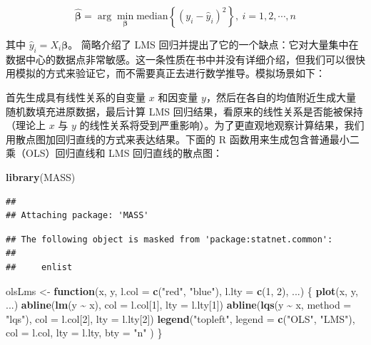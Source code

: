 \documentclass[
  b5paper,
  UTF8,twoside]{book}
\newenvironment{Shaded}{\begin{snugshade}}{\end{snugshade}}
\newcommand{\AttributeTok}[1]{\textcolor[rgb]{0.13,0.29,0.53}{#1}}
\newcommand{\ControlFlowTok}[1]{\textcolor[rgb]{0.13,0.29,0.53}{\textbf{#1}}}
\newcommand{\DecValTok}[1]{\textcolor[rgb]{0.00,0.00,0.81}{#1}}
\newcommand{\FunctionTok}[1]{\textcolor[rgb]{0.13,0.29,0.53}{\textbf{#1}}}
\newcommand{\NormalTok}[1]{#1}
\newcommand{\OtherTok}[1]{\textcolor[rgb]{0.56,0.35,0.01}{#1}}
\newcommand{\SpecialCharTok}[1]{\textcolor[rgb]{0.81,0.36,0.00}{\textbf{#1}}}
\newcommand{\StringTok}[1]{\textcolor[rgb]{0.31,0.60,0.02}{#1}}
\begin{document}
\[\hat{\boldsymbol{\beta}}=\arg\min_{\boldsymbol{\beta}}\text{median}\left\{ (y_{i}-\hat{y}_{i})^{2}\right\} ,\ i=1,2,\cdots,n\]

其中 \(\hat{y}_{i}=X_{i}\boldsymbol{\beta}\)。\citet{Venables02} 简略介绍了 LMS 回归并提出了它的一个缺点：它对大量集中在数据中心的数据点非常敏感。这一条性质在书中并没有详细介绍，但我们可以很快用模拟的方式来验证它，而不需要真正去进行数学推导。模拟场景如下：

首先生成具有线性关系的自变量 \(x\) 和因变量 \(y\)，然后在各自的均值附近生成大量随机数填充进原数据，最后计算 LMS 回归结果，看原来的线性关系是否能被保持（理论上 \(x\) 与 \(y\) 的线性关系将受到严重影响）。为了更直观地观察计算结果，我们用散点图加回归直线的方式来表达结果。下面的 R 函数用来生成包含普通最小二乘（OLS）回归直线和 LMS 回归直线的散点图：

\begin{Shaded}
\begin{Highlighting}[]
\FunctionTok{library}\NormalTok{(MASS)}
\end{Highlighting}
\end{Shaded}

\begin{verbatim}
## 
## Attaching package: 'MASS'
\end{verbatim}

\begin{verbatim}
## The following object is masked from 'package:statnet.common':
## 
##     enlist
\end{verbatim}

\begin{Shaded}
\begin{Highlighting}[]
\NormalTok{olsLms }\OtherTok{\textless{}{-}} \ControlFlowTok{function}\NormalTok{(x, y, }\AttributeTok{l.col =} \FunctionTok{c}\NormalTok{(}\StringTok{"red"}\NormalTok{, }\StringTok{"blue"}\NormalTok{),}
                   \AttributeTok{l.lty =} \FunctionTok{c}\NormalTok{(}\DecValTok{1}\NormalTok{, }\DecValTok{2}\NormalTok{), ...) \{}
  \FunctionTok{plot}\NormalTok{(x, y, ...)}
  \FunctionTok{abline}\NormalTok{(}\FunctionTok{lm}\NormalTok{(y }\SpecialCharTok{\textasciitilde{}}\NormalTok{ x), }\AttributeTok{col =}\NormalTok{ l.col[}\DecValTok{1}\NormalTok{], }\AttributeTok{lty =}\NormalTok{ l.lty[}\DecValTok{1}\NormalTok{])}
  \FunctionTok{abline}\NormalTok{(}\FunctionTok{lqs}\NormalTok{(y }\SpecialCharTok{\textasciitilde{}}\NormalTok{ x, }\AttributeTok{method =} \StringTok{"lqs"}\NormalTok{), }\AttributeTok{col =}\NormalTok{ l.col[}\DecValTok{2}\NormalTok{], }\AttributeTok{lty =}\NormalTok{ l.lty[}\DecValTok{2}\NormalTok{])}
  \FunctionTok{legend}\NormalTok{(}\StringTok{"topleft"}\NormalTok{,}
    \AttributeTok{legend =} \FunctionTok{c}\NormalTok{(}\StringTok{"OLS"}\NormalTok{, }\StringTok{"LMS"}\NormalTok{), }\AttributeTok{col =}\NormalTok{ l.col,}
    \AttributeTok{lty =}\NormalTok{ l.lty, }\AttributeTok{bty =} \StringTok{"n"}
\NormalTok{  )}
\NormalTok{\}}
\end{Highlighting}
\end{Shaded}
\end{document}
